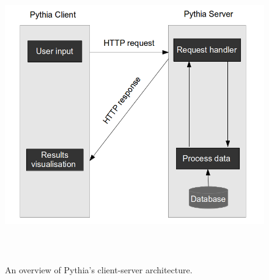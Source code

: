 \begin{figure}[htbp]
  \begin{center}
    \includegraphics[height=5in, width=6in]{pythia-overview}
    \caption{An overview of Pythia's client-server architecture.}
    \label{PythiaOverview}
  \end{center}
\end{figure} 

